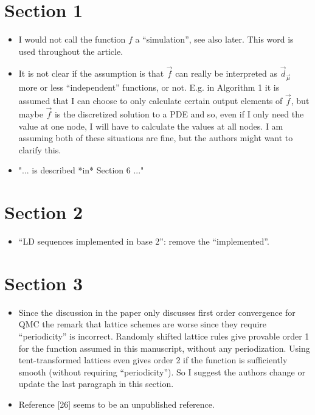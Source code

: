 \documentclass{article}[12pt]
\newcommand{\RefereeTODO}[1]{{\color{red} #1 \newline}}
\begin{document}
\section{Section 1}

\begin{itemize}
    \item \RefereeTODO{I would not call the function $f$ a ``simulation'', see also later. This word is used throughout the article.}
    \item \RefereeTODO{It is not clear if the assumption is that $\vec{f}$ can really be interpreted as $\vec{d}_{\vec{\mu}}$ more or less ``independent'' functions, or not. E.g. in Algorithm 1 it is assumed that I can choose to only calculate certain output elements of $\vec{f}$, but maybe $\vec{f}$ is the discretized solution to a PDE and so, even if I only need the value at one node, I will have to calculate the values at all nodes. I am assuming both of these situations are fine, but the authors might want to clarify this.}
    \item \RefereeTODO{"... is described *in* Section 6 ..."}
\end{itemize}

\section{Section 2}

\begin{itemize}
    \item \RefereeTODO{``LD sequences implemented in base 2'': remove the ``implemented''.} 
\end{itemize}

\section{Section 3}

\begin{itemize}
    \item \RefereeTODO{Since the discussion in the paper only discusses first order convergence for QMC the remark that lattice schemes are worse since they require ``periodicity'' is incorrect. Randomly shifted lattice rules give provable order 1 for the function assumed in this manuscript, without any periodization. Using tent-transformed lattices even gives order 2 if the function is sufficiently smooth (without requiring ``periodicity''). So I suggest the authors change or update the last paragraph in this section.}
    \item \RefereeTODO{Reference [26] seems to be an unpublished reference.}
\end{itemize}
\end{document}
